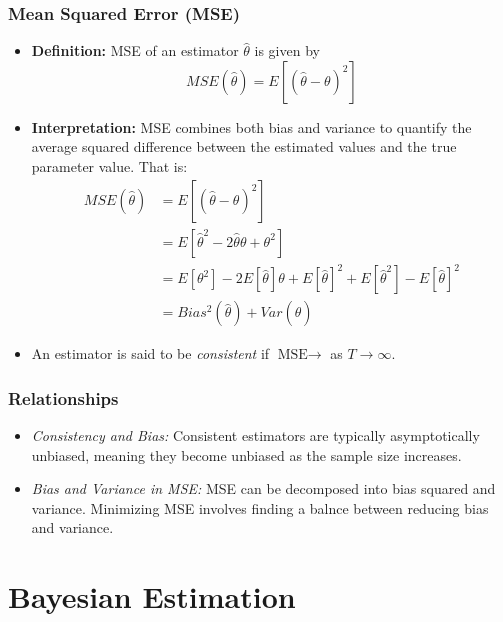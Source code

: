 \documentclass[12pt]{book}
\theoremstyle{definition}
\begin{document}
\subsubsection*{Mean Squared Error (MSE)}
 \begin{itemize}
    \item \textbf{Definition: } MSE of an estimator \(\hat{\theta}\) is given by 
    \[
    MSE(\hat{\theta}) = E[(\hat{\theta} - \theta)^2]
    \]
    
   \item \textbf{Interpretation: } MSE combines both bias and variance to quantify the average squared difference between the estimated values and the true parameter value. That is:
   \[
    \begin{aligned}
        MSE(\hat{\theta}) &=  E[(\hat{\theta} - \theta)^2]\\
                            & = E[\hat{\theta}^2  - 2 \hat{\theta} \theta + \theta^2] \\
                            & = E[\theta^2] - 2 E[\hat{\theta}] \theta + E[\hat{\theta}]^2 +  E[\hat{\theta}^2] - E[\hat{\theta}]^2 \\
                            & = Bias^2(\hat{\theta}) + Var(\hat{\theta})
    \end{aligned} 
   \]
   \item An estimator is said to be \emph{consistent} if $\text{MSE} \rightarrow$ as \(T\rightarrow \infty\).
\end{itemize}

 

\subsubsection*{Relationships}
\begin{itemize}
    \item \emph{Consistency and Bias:} Consistent estimators are typically asymptotically unbiased, meaning they become unbiased as the sample size increases.
    \item \emph{Bias and Variance in MSE: } MSE can be decomposed into bias squared and variance. Minimizing MSE involves finding a balnce between reducing bias and variance.
\end{itemize}




\section{Bayesian Estimation}
\label{sec:Bayesian_Estimation}
\end{document}
